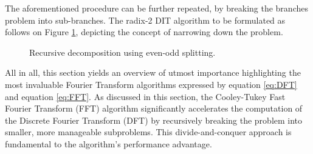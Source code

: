 {The aforementioned procedure can be further repeated, by breaking the branches problem into sub-branches. The radix-2 DIT algorithm to be formulated as follows on Figure \ref{fig:RecFFT}, depicting the concept of narrowing down the problem. 

\begin{figure}[h]
    \centering
    \caption{Recursive decomposition using even-odd splitting.}
    \label{fig:RecFFT}
\end{figure}

All in all, this section yields an overview of utmost importance highlighting the most invaluable Fourier Transform algorithms expressed by equation \eqref{eq:DFT} and equation \eqref{eq:FFT}.
As discussed in this section, the Cooley-Tukey Fast Fourier Transform (FFT) algorithm significantly accelerates the computation of the Discrete Fourier Transform (DFT) by recursively breaking the problem into smaller, more manageable subproblems. This divide-and-conquer approach is fundamental to the algorithm’s performance advantage.

}



